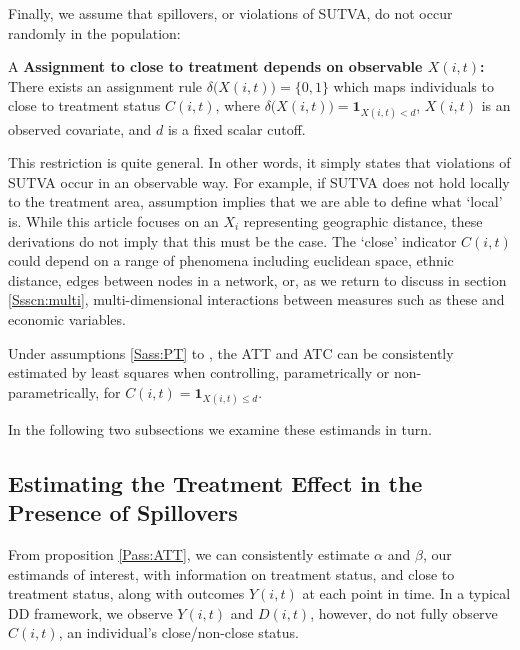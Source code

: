 Finally, we assume that spillovers, or violations of SUTVA, do not occur randomly
in the population:
\begin{assumption}{4}{A}
\label{Sass:SUTVAl}
\textbf{Assignment to close to treatment depends on observable $X(i,t)$:} \\ 
There exists an assignment rule $\delta\Big(X(i,t)\Big)=\{0,1\}$ which maps 
individuals to close to treatment status $C(i,t)$, where $\delta\Big(X(i,t)\Big)=
\mathbf{1}_{X(i,t)<d}$, $X(i,t)$ is an observed covariate, and $d$ is a fixed
scalar cutoff. 
\end{assumption}
\vspace{-4mm}
\noindent This restriction is quite general.  In other words, it simply states 
that violations of SUTVA occur in an observable way.  For example, if SUTVA does
not hold locally to the treatment area, assumption  implies
that we are able to define what `local' is.  While this article focuses on
an $X_i$ representing geographic distance, these derivations do not imply that 
this must be the case.  The `close' indicator $C(i,t)$ could depend on a range 
of phenomena including euclidean space, ethnic distance, edges between
nodes in a network, or, as we return to discuss in section
\ref{Ssscn:multi}, multi-dimensional interactions between measures such as these 
and economic variables. 
\begin{proposition}
\label{Pass:ATT}
Under assumptions \ref{Sass:PT} to , the ATT and ATC can be 
consistently estimated by least squares when controlling, parametrically or
non-parametrically, for $C(i,t)=\mathbf{1}_{X(i,t)\leq d}$.
\end{proposition}
\noindent In the following two subsections we examine these estimands in turn. 

\subsection{Estimating the Treatment Effect in the Presence of Spillovers}
\label{Ssscn:TE}
From proposition \ref{Pass:ATT}, we can consistently estimate $\alpha$ and 
$\beta$, our estimands of interest, with information on treatment status, and 
close to treatment status, along with outcomes $Y(i,t)$ at each point in time. In 
a typical DD framework, we observe $Y(i,t)$ and $D(i,t)$, however, do not fully 
observe $C(i,t)$, an individual's close/non-close status.


